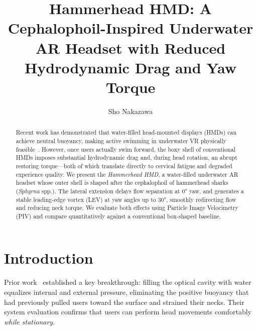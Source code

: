 \documentclass[sigconf]{acmart}
\begin{document}
\title{Hammerhead HMD: A Cephalophoil-Inspired Underwater AR Headset
       with Reduced Hydrodynamic Drag and Yaw Torque}

\author{Sho Nakazawa}


\begin{abstract}
Recent work has demonstrated that water-filled head-mounted displays (HMDs)
can achieve neutral buoyancy, making active swimming in underwater VR physically
feasible~\cite{zhang2016safe,osone2017optimized}.
However, once users actually swim forward, the boxy shell of conventional HMDs
imposes substantial hydrodynamic drag and, during head rotation, an abrupt
restoring torque—both of which translate directly to cervical fatigue
and degraded experience quality.
We present the \textit{Hammerhead HMD}, a water-filled underwater AR headset
whose outer shell is shaped after the cephalophoil of hammerhead sharks
(\textit{Sphyrna} spp.).
The lateral extension delays flow separation at 0° yaw,
and generates a stable leading-edge vortex (LEV) at yaw angles up to 30°,
smoothly redirecting flow and reducing neck torque.
We evaluate both effects using Particle Image Velocimetry (PIV)
and compare quantitatively against a conventional box-shaped baseline.
\end{abstract}


\maketitle

\section{Introduction}

Prior work~\cite{zhang2016safe,osone2017optimized} established a key
breakthrough: filling the optical cavity with water equalizes internal
and external pressure, eliminating the positive buoyancy that had
previously pulled users toward the surface and strained their necks.
Their system evaluation confirms that users can perform head movements
comfortably \textit{while stationary}.
\end{document}
